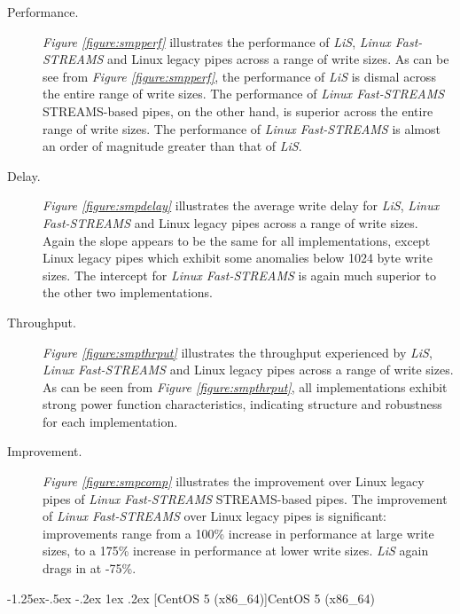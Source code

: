 \documentclass[letterpaper,final,notitlepage,twocolumn,10pt,twoside]{article}
\makeatletter
\renewcommand\subsubsection{\@startsection{subsubsection}{3}{\z@}%
                                     {-1.25ex\@plus -.5ex \@minus -.2ex}%
                                     {1ex \@plus .2ex}%
                                     {\normalfont\normalsize\bfseries}}
\makeatother
\begin{document}
\begin{description}

\item[Performance.]

\textit{Figure \ref{figure:smpperf}} illustrates the performance of
\textsl{LiS}, \textsl{Linux Fast-STREAMS} and Linux legacy pipes across a
range of write sizes.  As can be see from \textit{Figure
\ref{figure:smpperf}}, the performance of \textsl{LiS} is dismal across the
entire range of write sizes.  The performance of \textsl{Linux Fast-STREAMS}
STREAMS-based pipes, on the other hand, is superior across the entire range of
write sizes.  The performance of \textsl{Linux Fast-STREAMS} is almost an
order of magnitude greater than that of \textsl{LiS}.

\item[Delay.]

\textit{Figure \ref{figure:smpdelay}} illustrates the average write delay for
\textsl{LiS}, \textsl{Linux Fast-STREAMS} and Linux legacy pipes across a
range of write sizes.  Again the slope appears to be the same for all
implementations, except Linux legacy pipes which exhibit some anomalies
below 1024 byte write sizes.  The intercept for \textsl{Linux Fast-STREAMS} is
again much superior to the other two implementations.

\item[Throughput.]

\textit{Figure \ref{figure:smpthrput}} illustrates the throughput experienced
by \textsl{LiS}, \textsl{Linux Fast-STREAMS} and Linux legacy pipes across a
range of write sizes.  As can be seen from \textit{Figure
\ref{figure:smpthrput}}, all implementations exhibit strong power function
characteristics, indicating structure and robustness for each implementation.

\item[Improvement.]

\textit{Figure \ref{figure:smpcomp}} illustrates the improvement over Linux
legacy pipes of \textsl{Linux Fast-STREAMS} STREAMS-based pipes.  The
improvement of \textsl{Linux Fast-STREAMS} over Linux legacy pipes is
significant: improvements range from a 100\% increase in performance at large
write sizes, to a 175\% increase in performance at lower write sizes.
\textsl{LiS} again drags in at -75\%.

\end{description}

\subsubsection[CentOS 5 (x86\_64)]{CentOS 5 (x86\_64)}
\end{document}

